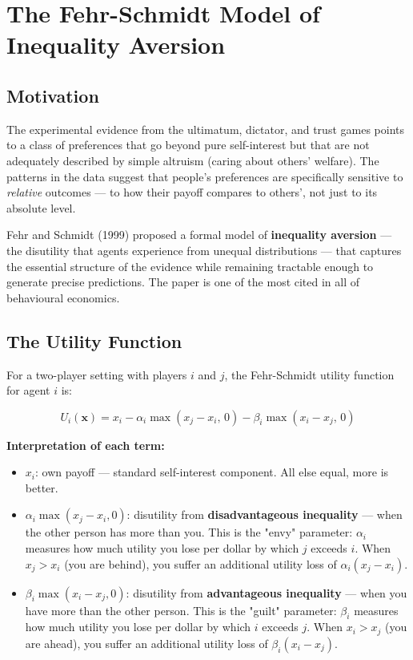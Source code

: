 \documentclass[12pt, letterpaper]{article}
\begin{document}
\medskip


\section{The Fehr-Schmidt Model of Inequality Aversion}



\subsection{Motivation}


The experimental evidence from the ultimatum, dictator, and trust games points to a class of preferences that go beyond pure self-interest but that are not adequately described by simple altruism (caring about others' welfare). The patterns in the data suggest that people's preferences are specifically sensitive to \textit{relative} outcomes --- to how their payoff compares to others', not just to its absolute level.

Fehr and Schmidt (1999) proposed a formal model of \textbf{inequality aversion} --- the disutility that agents experience from unequal distributions --- that captures the essential structure of the evidence while remaining tractable enough to generate precise predictions. The paper is one of the most cited in all of behavioural economics.


\subsection{The Utility Function}


For a two-player setting with players $i$ and $j$, the Fehr-Schmidt utility function for agent $i$ is:

$$U_i(\mathbf{x}) = x_i - \alpha_i \max(x_j - x_i, \, 0) - \beta_i \max(x_i - x_j, \, 0)$$

\textbf{Interpretation of each term:}

\begin{itemize}
\item $x_i$: own payoff --- standard self-interest component. All else equal, more is better.

\item $\alpha_i \max(x_j - x_i, 0)$: disutility from \textbf{disadvantageous inequality} --- when the other person has more than you. This is the "envy" parameter: $\alpha_i$ measures how much utility you lose per dollar by which $j$ exceeds $i$. When $x_j > x_i$ (you are behind), you suffer an additional utility loss of $\alpha_i (x_j - x_i)$.

\item $\beta_i \max(x_i - x_j, 0)$: disutility from \textbf{advantageous inequality} --- when you have more than the other person. This is the "guilt" parameter: $\beta_i$ measures how much utility you lose per dollar by which $i$ exceeds $j$. When $x_i > x_j$ (you are ahead), you suffer an additional utility loss of $\beta_i (x_i - x_j)$.
\end{itemize}
\end{document}
